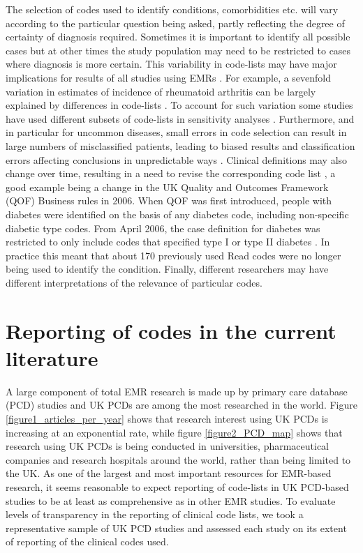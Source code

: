 \documentclass[10pt]{article}
\begin{document}
The selection of codes used to identify conditions, comorbidities etc.  will vary according to the particular question being asked, partly reflecting the degree of certainty of diagnosis required. Sometimes it is important to identify all possible cases but at other times the study population may need to be restricted to cases where diagnosis is more certain. This variability in code-lists may have major implications for results of all studies using EMRs \cite{Nicholson2011}. For example, a sevenfold variation in estimates of incidence of rheumatoid arthritis can be largely explained by differences in code-lists \cite{Garcia2009, Watson2003}.  To account for such variation some studies have used different subsets of code-lists in sensitivity analyses \cite{Doran2011, Herrett2010}.  Furthermore, and in particular for uncommon diseases, small errors in code selection can result in large numbers of misclassified patients, leading to biased results and classification errors affecting conclusions in unpredictable ways \cite{Manuel2010}. Clinical definitions may also change over time, resulting in a need to revise the corresponding code list \cite{Gulliford2009}, a good example being a change in the UK Quality and Outcomes Framework (QOF) Business rules in 2006. When QOF was first introduced, people with diabetes were identified on the basis of any diabetes code, including non-specific diabetic type codes.  From April 2006, the case definition for diabetes was restricted to only include codes that specified type I or type II diabetes \cite{Calvert2009}.  In practice this meant that about 170 previously used Read codes were no longer being used to identify the condition. Finally, different researchers may have different interpretations of the relevance of particular codes.

\section*{Reporting of codes in the current literature}

A large component of total EMR research is made up by primary care database (PCD) studies and UK PCDs are among the most researched in the world.  Figure \ref{figure1_articles_per_year} shows that research interest using UK PCDs is increasing at an exponential rate, while figure \ref{figure2_PCD_map} shows that research using UK PCDs is being conducted in universities, pharmaceutical companies and research hospitals around the world, rather than being limited to the UK.  As one of the largest and most important resources for EMR-based research, it seems reasonable to expect reporting of code-lists in UK PCD-based studies to be at least as comprehensive as in other EMR studies.  To evaluate levels of transparency in the reporting of clinical code lists, we took a representative sample of UK PCD studies and assessed each study on its extent of reporting of the clinical codes used.
\end{document}
